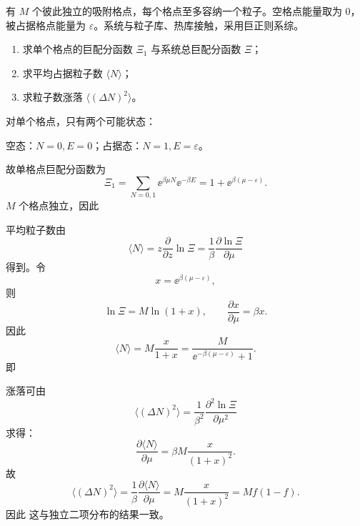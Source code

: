 \begin{question}
有 $M$ 个彼此独立的吸附格点，每个格点至多容纳一个粒子。空格点能量取为 $0$，被占据格点能量为 $\varepsilon$。系统与粒子库、热库接触，采用巨正则系综。

\begin{enumerate}[label=(\arabic*),leftmargin=2.5em]
  \item 求单个格点的巨配分函数 $\Xi_1$ 与系统总巨配分函数 $\Xi$；
  \item 求平均占据粒子数 $\langle N\rangle$；
  \item 求粒子数涨落 $\langle(\Delta N)^2\rangle$。
\end{enumerate}

\begin{solution}
对单个格点，只有两个可能状态：

空态：$N=0,E=0$；\qquad 占据态：$N=1,E=\varepsilon$。

故单格点巨配分函数为
\[
\Xi_1=\sum_{N=0,1} \ee^{\beta\mu N}\ee^{-\beta E}
=1+\ee^{\beta(\mu-\varepsilon)}.
\]
$M$ 个格点独立，因此

平均粒子数由
\[
\langle N\rangle
=z\frac{\partial}{\partial z}\ln \Xi
=\frac{1}{\beta}\frac{\partial \ln\Xi}{\partial\mu}
\]
得到。令
\[
x=\ee^{\beta(\mu-\varepsilon)},
\]
则
\[
\ln\Xi=M\ln(1+x),
\qquad
\frac{\partial x}{\partial\mu}=\beta x.
\]
因此
\[
\langle N\rangle
=M\frac{x}{1+x}
=
\frac{M}{\ee^{-\beta(\mu-\varepsilon)}+1}.
\]
即

涨落可由
\[
\langle(\Delta N)^2\rangle
=\frac{1}{\beta^2}\frac{\partial^2 \ln\Xi}{\partial\mu^2}
\]
求得：
\[
\frac{\partial \langle N\rangle}{\partial\mu}
=\beta M\frac{x}{(1+x)^2}.
\]
故
\[
\langle(\Delta N)^2\rangle
=\frac{1}{\beta}\frac{\partial \langle N\rangle}{\partial\mu}
=M\frac{x}{(1+x)^2}
=Mf(1-f).
\]
因此
这与独立二项分布的结果一致。
\end{solution}
\end{question}
